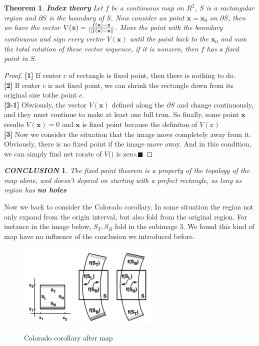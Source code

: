 \documentclass[12pt]{article}
\theoremstyle{plain}
\newtheorem{theorem}{\textbf{Theorem}}[section]
\newtheorem{proof}{\textit{PROOF}}[section]
\newtheorem{conclusion}{\textit{\textbf{CONCLUSION}}}[section]
\begin{document}
\begin{theorem} \textbf{Index theory} Let $f$ be a continuous map on $R^2$, $S$ is a ractangular region and $\partial S$ is the boundary of $S$. Now consider an point $\mathbf x = \mathbf x_0$ on $\partial S$, then we have the vector $V(\mathbf x) = {f(\mathbf x) - \mathbf x \over ||f(\mathbf x) - \mathbf x||}$. Move the point with the boundary continuous and sign every vector $V(\mathbf x)$ until the point back to the $\mathbf x_0$ and sum the total rotation of these vector sequence, if it is nonzero, then $f$ has a fixed point in $S$.
\end{theorem}
{\color{blue}
\begin{proof} \textbf{[1]} If center $c$ of rectangle is fixed point, then there is nothing to do.
\\\noindent \textbf{[2]} If center $c$ is not fixed point, we can shrink the rectangle down from its original size tothe point $c$. 
\\\noindent \textbf{[2-1]} Obviously, the vector $V(\mathbf x)$ defined along the $\partial S$ and change continuously, and they must continue to make at least one full trun. So finally, some point $\mathbf x$ results $V(\mathbf x) = 0$ and $\mathbf x$ is fixed point because the definiton of $V(x)$
\\\noindent \textbf{[3]} Now we consider the situation that the image move completely away from it. Obviously, there is no fixed point if the image move away. And in this condition, we can simply find net rorate of $V(\mathbf)$ is zero.$\blacksquare$
\end{proof}
}



\begin{conclusion} The fixed point theorem is a property of the topology of the map alone, and doesn't depend on starting with a prefect rectangle, as long as region has \textbf{no holes}
\end{conclusion}

Now we back to consider the Colorado corollary. In some situation the region not only expand from the origin interval, but also fold from the original region. For instance in the image below, $S_T, S_B$ fold in the subimage 3. We found this kind of map have no influence of the conclusion we introduced before.



\begin{figure}[H]
\begin{center}
\includegraphics[width=0.6\textwidth]{figure/section5/colorado-corollary.png} \\
\end{center}
\caption{Colorado corollary after map}
\end{figure}
\end{document}
